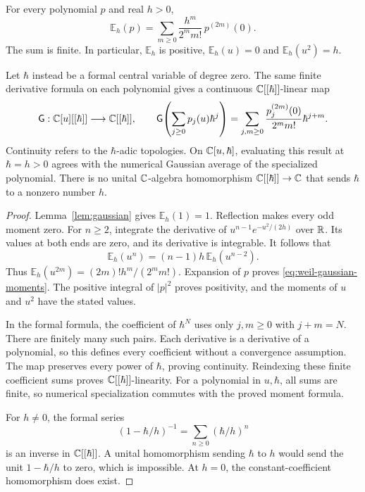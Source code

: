 \begin{proposition}
\label{prop:weil-gaussian-comparison}
For every polynomial $p$ and real $h>0$,
\begin{equation}
 \mathbb E_h(p)
 =\sum_{m\geq0}\frac{h^m}{2^m m!}\,p^{(2m)}(0).
 \label{eq:weil-gaussian-moments}
\end{equation}
The sum is finite.  In particular, $\mathbb E_h$ is positive,
$\mathbb E_h(u)=0$ and $\mathbb E_h(u^2)=h$.

Let $\hbar$ instead be a formal central variable of degree zero.
The same finite derivative formula on each polynomial gives a continuous
$\mathbb C[[\hbar]]$-linear map
\[
 \mathsf G:\mathbb C[u][[\hbar]]\longrightarrow\mathbb C[[\hbar]],\qquad
 \mathsf G\!\left(\sum_{j\geq0}p_j(u)\hbar^j\right)
  =\sum_{j,m\geq0}\frac{p_j^{(2m)}(0)}{2^m m!}\hbar^{j+m}.
\]
Continuity refers to the $\hbar$-adic topologies.
On $\mathbb C[u,\hbar]$, evaluating this result at $\hbar=h>0$ agrees
with the numerical Gaussian average of the specialized polynomial.
There is no unital $\mathbb C$-algebra homomorphism
$\mathbb C[[\hbar]]\to\mathbb C$ that sends $\hbar$ to a nonzero number $h$.
\end{proposition}
\begin{proof}
Lemma~\ref{lem:gaussian} gives $\mathbb E_h(1)=1$.
Reflection makes every odd moment zero.
For $n\geq2$, integrate the derivative of
$u^{n-1}e^{-u^2/(2h)}$ over $\mathbb R$.
Its values at both ends are zero, and its derivative is integrable.
It follows that
\[
 \mathbb E_h(u^n)=(n-1)h\,\mathbb E_h(u^{n-2}).
\]
Thus
$\mathbb E_h(u^{2m})=(2m)!h^m/(2^m m!)$.
Expansion of $p$ proves \eqref{eq:weil-gaussian-moments}.
The positive integral of $|p|^2$ proves positivity, and the moments
of $u$ and $u^2$ have the stated values.

In the formal formula, the coefficient of $\hbar^N$ uses only
$j,m\geq0$ with $j+m=N$.  There are finitely many such pairs.
Each derivative is a derivative of a polynomial, so this defines every
coefficient without a convergence assumption.
The map preserves every power of $\hbar$, proving continuity.
Reindexing these finite coefficient sums proves
$\mathbb C[[\hbar]]$-linearity.  For a polynomial in $u,\hbar$, all sums are
finite, so numerical specialization commutes with the proved moment formula.

For $h\ne0$, the formal series
\[
 (1-\hbar/h)^{-1}=\sum_{n\geq0}(\hbar/h)^n
\]
is an inverse in $\mathbb C[[\hbar]]$.
A unital homomorphism sending $\hbar$ to $h$ would send the unit
$1-\hbar/h$ to zero, which is impossible.
At $h=0$, the constant-coefficient homomorphism does exist.
\end{proof}


